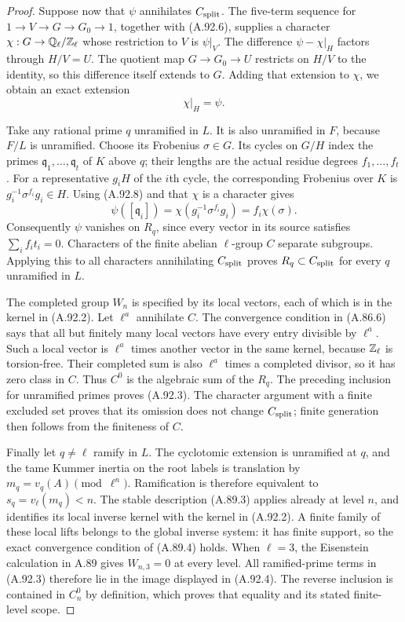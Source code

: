 \begin{proof}
Suppose now that $\psi$ annihilates $C_{\rm split}$.
The five-term sequence for $1\to V\to G\to G_0\to1$,
together with (A.92.6), supplies a character
$\chi:G\to\mathbb Q_\ell/\mathbb Z_\ell$ whose restriction to $V$ is
$\psi|_V$.
The difference $\psi-\chi|_H$ factors through $H/V=U$.
The quotient map $G\to G_0\to U$ restricts on $H/V$ to
the identity, so this difference itself extends to $G$.
Adding that extension to $\chi$, we obtain an exact extension
\[
                              \chi|_H=\psi.
 \tag{A.92.8}
\]

Take any rational prime $q$ unramified in $L$.
It is also unramified in $F$, because $F/L$ is unramified.
Choose its Frobenius $\sigma\in G$.
Its cycles on $G/H$ index the primes
$\mathfrak q_1,\ldots,\mathfrak q_t$ of $K$ above $q$;
their lengths are the actual residue degrees $f_1,\ldots,f_t$.
For a representative $g_iH$ of the $i$th cycle, the
corresponding Frobenius over $K$ is
$g_i^{-1}\sigma^{f_i}g_i\in H$.
Using (A.92.8) and that $\chi$ is a character gives
\[
 \psi([\mathfrak q_i])
       =\chi(g_i^{-1}\sigma^{f_i}g_i)
       =f_i\chi(\sigma).
 \tag{A.92.9}
\]
Consequently $\psi$ vanishes on $R_q$, since every vector
in its source satisfies $\sum_i f_i t_i=0$.
Characters of the finite abelian $\ell$-group $C$ separate
subgroups.  Applying this to all characters annihilating
$C_{\rm split}$ proves
$R_q\subset C_{\rm split}$ for every $q$ unramified in $L$.

The completed group $W_n$ is specified by its local vectors,
each of which is in the kernel in (A.92.2).
Let $\ell^a$ annihilate $C$.
The convergence condition in (A.86.6) says that all but
finitely many local vectors have every entry divisible by
$\ell^a$.  Such a local vector is $\ell^a$ times another
vector in the same kernel, because $\mathbb Z_\ell$ is torsion-free.
Their completed sum is also $\ell^a$ times a completed
divisor, so it has zero class in $C$.
Thus $C^0$ is the algebraic sum of the $R_q$.
The preceding inclusion for unramified primes proves
(A.92.3).  The character argument with a finite excluded
set proves that its omission does not change
$C_{\rm split}$; finite generation then follows from the
finiteness of $C$.

Finally let $q\ne\ell$ ramify in $L$.
The cyclotomic extension is unramified at $q$, and the
tame Kummer inertia on the root labels is translation by
$m_q=v_q(A)\pmod{\ell^n}$.
Ramification is therefore equivalent to
$s_q=v_\ell(m_q)<n$.
The stable description (A.89.3) applies already at level
$n$, and identifies its local inverse kernel with the
kernel in (A.92.2).  A finite family of these local lifts
belongs to the global inverse system: it has finite support,
so the exact convergence condition of (A.89.4) holds.
When $\ell=3$, the Eisenstein calculation in A.89 gives
$W_{n,3}=0$ at every level.  All ramified-prime terms in
(A.92.3) therefore lie in the image displayed in (A.92.4).
The reverse inclusion is contained in $C_n^0$ by definition,
which proves that equality and its stated finite-level scope.
\end{proof}

